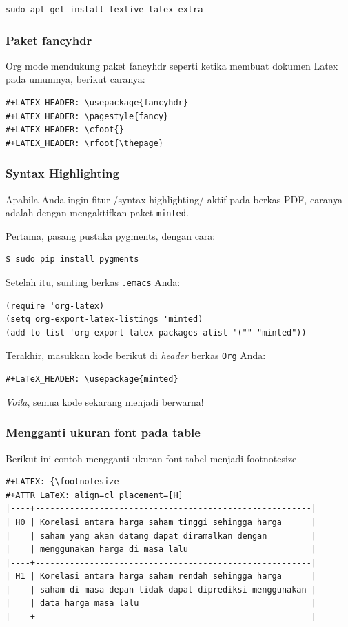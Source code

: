 \documentclass{article}
\begin{document}
\begin{verbatim}
sudo apt-get install texlive-latex-extra
\end{verbatim}

\subsubsection{Paket fancyhdr}
Org mode mendukung paket fancyhdr seperti ketika membuat dokumen Latex
pada umumnya, berikut caranya:

\begin{verbatim}
#+LATEX_HEADER: \usepackage{fancyhdr}
#+LATEX_HEADER: \pagestyle{fancy}
#+LATEX_HEADER: \cfoot{}
#+LATEX_HEADER: \rfoot{\thepage}
\end{verbatim}

\subsubsection{Syntax Highlighting}
Apabila Anda ingin fitur /syntax highlighting/ aktif pada berkas PDF,
caranya adalah dengan mengaktifkan paket \verb=minted=.

Pertama, pasang pustaka pygments, dengan cara:

\begin{verbatim}
$ sudo pip install pygments
\end{verbatim}

Setelah itu, sunting berkas \verb=.emacs= Anda:

\begin{verbatim}
(require 'org-latex)
(setq org-export-latex-listings 'minted)
(add-to-list 'org-export-latex-packages-alist '("" "minted"))
\end{verbatim}

Terakhir, masukkan kode berikut di \emph{header} berkas \verb=Org= Anda:
\begin{verbatim}
#+LaTeX_HEADER: \usepackage{minted}
\end{verbatim}

\emph{Voila}, semua kode sekarang menjadi berwarna!

\subsubsection{Mengganti ukuran font pada table}
Berikut ini contoh mengganti ukuran font tabel menjadi footnotesize
\begin{verbatim}
#+LATEX: {\footnotesize
#+ATTR_LaTeX: align=cl placement=[H]
|----+--------------------------------------------------------|
| H0 | Korelasi antara harga saham tinggi sehingga harga      |
|    | saham yang akan datang dapat diramalkan dengan         |
|    | menggunakan harga di masa lalu                         |
|----+--------------------------------------------------------|
| H1 | Korelasi antara harga saham rendah sehingga harga      |
|    | saham di masa depan tidak dapat diprediksi menggunakan |
|    | data harga masa lalu                                   |
|----+--------------------------------------------------------|
\end{verbatim}
\end{document}

